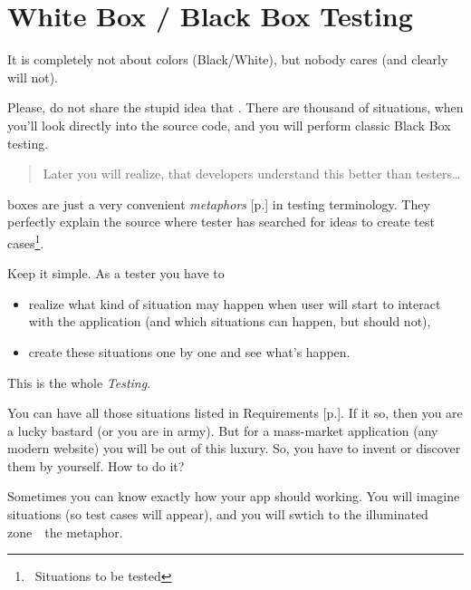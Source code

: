 \section{White Box / Black Box Testing}
\label{sec:White Box Black Box Testing}

It is completely not about colors (Black/White), but nobody cares (and clearly will not).

Please, do not share the stupid idea that . There are thousand of situations, when you'll look directly into the source code, and you will perform classic Black Box testing.

\begin{quote}
 Later you will realize, that developers understand this  better than testers\ldots
\end{quote} 

  boxes are just a very convenient \emph{metaphors} [p.\pageref{sec:Metaphor}] in testing terminology. They perfectly explain the source where tester has searched for ideas to create test cases\footnote{~Situations to be tested}.

Keep it simple.  As a tester you have to 
\begin{itemize}
\item 
realize what kind of situation may happen when user will start to interact with the application (and which situations can happen, but should not), 
\item 
create these situations one by one and see what's happen.                                                                                                                                                                                                              \end{itemize}

This is the whole \emph{Testing}.

You can have all those situations listed in Requirements [p.\pageref{sec:Requirement}]. If it so, then you are a lucky bastard (or you are in army). But for a mass-market application (any modern website) you will be out of this luxury. So, you have to invent or discover them by yourself. How to do it?

Sometimes you can know exactly how your app should working. You will imagine situations (so test cases will appear), and you will swtich to the illuminated zone~\textemdash~the  metaphor.

